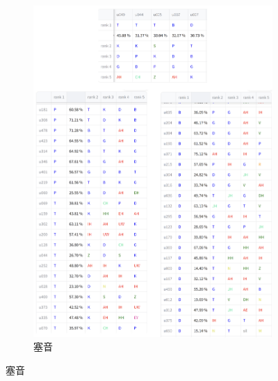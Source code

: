 
    {
        \newcommand{\tempwidth}[0]{0.8\linewidth}
        \begin{figure}
             \centering
             \begin{subfigure}{\textwidth}
                 \centering
                 \includegraphics[width=\tempwidth]{figures/ch4figs/plo_phn.png}
                 \caption{塞音}
                 \label{fig:hub-u050-ap0500-ploobs}
             \end{subfigure}


\end{figure}}

